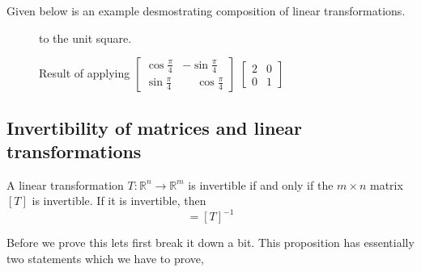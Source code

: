 \documentclass[12pt]{article}
\theoremstyle{remark}
\numberwithin{equation}{section}
\begin{document}
Given below is an example desmostrating composition of linear transformations. 

\begin{figure}[htp]
	\centering
{}
\caption{Result of applying $ \begin{bmatrix} %
		\cos{\frac{\pi}{4}} & -\sin{\frac{\pi}{4}} \\ 
		\sin{\frac{\pi}{4}} & \phantom{-}\cos{\frac{\pi}{4}} %
				\end{bmatrix} $ %
		$	\begin{bmatrix}
				2 & 0 \\
				0 & 1 %
			\end{bmatrix} $ %
			} to the unit square. 
\end{figure}

\subsection{Invertibility of matrices and linear transformations}%
\label{sub:Invertibility of matrices and linear transformations}


\begin{important}[Proposition 2.3]
	A linear transformation $ T : \mathbb{R}^n \rightarrow \mathbb{R}^m $ is invertible if and only if the $ m \times n $ matrix $ [T] $ is invertible. If it is invertible, then 
	\begin{equation}
		[T^{-1}] = [T]^{-1}
	\end{equation}
\end{important}

Before we prove this lets first break it down a bit. This proposition has essentially two statements which we have to prove, 
\end{document}
